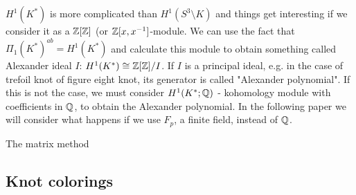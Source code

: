 $H^1(K^*)$ is more complicated than $H^1(S^3\setminus K)$ and things get interesting if we consider it as a $\operatorname{\mathbb{Z}}[\operatorname{\mathbb{Z}}]$ (or $\operatorname{\mathbb{Z}}[x, x^{-1}]$-module. We can use the fact that $\Pi_1(K^*)^{ab}=H^1(K^*)$ and calculate this module to obtain something called Alexander ideal $I$: $H^1(K^*)\cong \operatorname{\mathbb{Z}}[\operatorname{\mathbb{Z}}]/I$. If $I$ is a principal ideal, e.g. in the case of trefoil knot of figure eight knot, its generator is called "Alexander polynomial". If this is not the case, we must consider $H^1(K^*; \operatorname{\mathbb{Q}})$ - kohomology module with coefficients in $\operatorname{\mathbb{Q}}$, to obtain the Alexander polynomial. In the following paper we will consider what happens if we use $F_p$, a finite field, instead of $\operatorname{\mathbb{Q}}$.

The matrix method

\subsection{Knot colorings}

